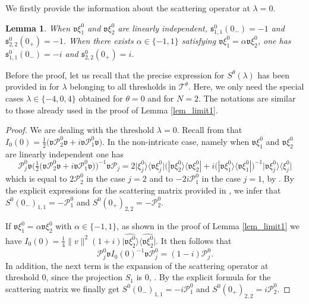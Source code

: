 \documentclass[11pt]{article}
\def\P{\mathcal P}
\def\s{\mathfrak s}
\def\T{\mathcal T}
\def\v{\mathfrak v}
\def\ltwo{\mathop{\mathrm{L}^2}\nolimits}
\newtheorem{Lemma}[Theorem]{Lemma}
\begin{document}
We firstly provide the information about the scattering operator at $\lambda=0$.

\begin{Lemma}\label{lem_aa}
When $\v\xi^0_1$ and $\v\xi^0_2$ are linearly independent, 
 $\s^0_{1,1}(0_-) = -1$ and $\s^0_{2,2}(0_+) =  -1$. 
When there exists $\alpha\in \{-1,1\}$ satisfying $\v\xi^0_{1}=\alpha \v \xi^0_2$,
one has $\s^0_{1,1}(0_-) = -i$ and $\s^0_{2,2}(0_+) =  i$.
\end{Lemma}

Before the proof, let us recall that the precise expression for $S^\theta(\lambda)$
has been provided in \cite[Thm.~3.9]{NRT} for $\lambda$ belonging to all thresholds in $\T^\theta$.
Here, we only need the special cases $\lambda \in \{-4,0,4\}$ obtained for $\theta=0$ and for 
$N=2$. The notations are
similar to those already used in the proof of Lemma \ref{lem_limit1}.

\begin{proof}
We are dealing with the threshold $\lambda=0$.
Recall from \cite[Sec.~4.3]{NRT} that $I_0(0)=\frac{1}{2}\big(\v \P^0_2\v+i\v \P^0_{1}\v\big)$.
In the non-intricate case, namely when $\v \xi^0_1$ and $\v \xi^0_2$ are linearly independent
one has
\begin{equation*}
\P^0_j \v \Big(\tfrac{1}{2}\big(\v \P^0_2\v+i\v \P^0_{1}\v\big)\Big)^{-1} \v \P_j
=2 \big|\xi^0_j\big\rangle  \big\langle \v \xi^0_j\big|
\Big(|\v\xi^0_2\rangle  \langle \v \xi^0_2|+ i(|\v\xi^0_1\rangle  \langle \v \xi^0_1|\Big)^{-1}
\big|\v\xi^0_j\big\rangle  \big\langle \xi^0_j\big|
\end{equation*}
which is equal to $2\P^0_2$ in the case $j=2$ and to $-2i\P^0_1$ in the case $j=1$,
by \cite[Lem.~A.1]{ANRR}.
By the explicit expressions for the scattering matrix provided in \cite[Thm.~3.9]{NRT}, 
we infer that
$S^0(0_-)_{1,1}=-\P^0_{1}$ and $S^0(0_+)_{2,2}=-\P^0_{2}$.

If $\v \xi^0_1=\alpha \v \xi^0_2$ with $\alpha\in \{-1,1\}$, as shown in the proof of Lemma \ref{lem_limit1}
we have 
$I_0(0)=\frac{1}{4} \|v\|_{\ltwo}^2 (1+i)  \big|\widehat{\v\xi_{2}^0}\big\rangle \big\langle \widehat{\v\xi_{2}^0}\big|$. It then follows that
$$
\P^0_j \v I_0(0)^{-1}\v\P^0_j = (1-i)\P^0_j.
$$
In addition, the next term is the expansion of the scattering operator 
at threshold $0$, since the projection $S_1$ is $0$,  
\cite[Lem.~4.9]{NRT}.
By the explicit formula for the scattering matrix we finally get
$S^0(0_-)_{1,1}=-i\P^0_{1}$ and $S^0(0_+)_{2,2}=i\P^0_{2}$.
\end{proof}
\end{document}

